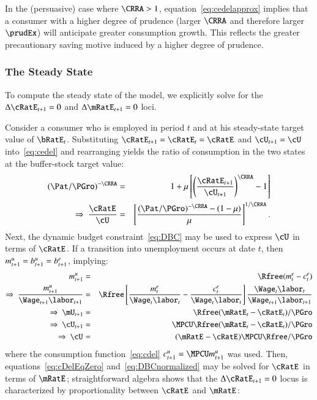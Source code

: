 \documentclass[titlepage,abstract]{\econtex}\newcommand{\texname}{ctDiscrete}
\begin{document}
In the (persuasive) case where $\CRRA > 1$, equation~\eqref{eq:cedelapprox} implies that a consumer with a higher degree of prudence (larger $\CRRA$ and therefore larger $\prudEx$) will anticipate greater consumption growth.  This reflects the greater precautionary saving motive induced by a higher degree of prudence.

\subsubsection{The Steady State}
To compute the steady state of the model, we explicitly solve for the $\Delta \cRatE_{t+1}=0$ and $\Delta \mRatE_{t+1}=0$ loci. 

Consider a consumer who is employed in period $t$ and at his steady-state target value of $\bRatE_{t}$. Substituting $\cRatE_{t+1} = \cRatE_{t} = \cRatE_{\tSS}$ and  $\cU_{t+1} =  \cU_{\tSS}$ into~\eqref{eq:cedel} and rearranging yields the ratio of consumption in the two states at the buffer-stock target value:
\begin{eqnarray}
  (\Pat/\PGro)^{-\CRRA}
  & = & 
  1+\urate
  \left[\left(\frac{\cRatE_{t+1}}{\cU_{t+1}}\right)^{\CRRA}-1\right]
\nonumber  
\\
\Rightarrow \
\frac{\cRatE_{\tSS}}{\cU_{\tSS}} 
& = & 
\left[\frac{(\Pat/\PGro)^{-\CRRA}-(1-\urate)}{\urate}\right]^{1/\CRRA}
\label{eq:cDelEqZero}
.
\end{eqnarray}
Next, the dynamic budget constraint~\eqref{eq:DBC} may be used to express $\cU_{\tSS}$ in terms of $\cRatE_{\tSS}$. If a transition into unemployment occurs at date $t$, then $m_{t+1}^{u} = b_{t+1}^{u} = b_{t+1}^{e}$, implying:
\begin{eqnarray}
  \mLev_{t+1}^{u}
  & = & 
  \Rfree (\mLev_{t}^{e}-\cLev_{t}^{e})
\nonumber  
\\
\Rightarrow \
\frac{\mLev_{t+1}^{u}}{\Wage_{t+1}\labor_{t+1}}
  & = & 
\Rfree \left[\frac{\mLev_{t}^{e}}{\Wage_{t}\labor_{t}} - \frac{\cLev_{t}^{e}}{\Wage_{t}\labor_{t}}\right] \frac{\Wage_{t}\labor_{t}}{\Wage_{t+1}\labor_{t+1}}
\nonumber  
\\
\Rightarrow \
\mU_{t+1} 
  & = & 
 \Rfree (\mRatE_{t}-\cRatE_{t})/\PGro 
\nonumber  
\\
\Rightarrow \
\cU_{t+1} 
  & = & 
 \MPCU \Rfree (\mRatE_{t}-\cRatE_{t})/\PGro 
\nonumber  
\\
\Rightarrow \
\cU_{\tSS}
  & = & 
(\mRatE_{\tSS}-\cRatE_{\tSS}) \MPCU \Rfree/\PGro 
\label{eq:DBCnormalized}
\end{eqnarray}
where the consumption function~\eqref{eq:cdel} $\cLev_{t+1}^{u} =  \MPCU \mLev_{t+1}^{u}$ was used. Then, equations~\eqref{eq:cDelEqZero} and~\eqref{eq:DBCnormalized} may be solved for $\cRatE_{\tSS}$ in terms of $\mRatE_{\tSS}$; straightforward algebra shows that the $\Delta \cRatE_{t+1}=0$ locus is characterized by proportionality between $\cRatE_{\tSS}$ and $\mRatE_{\tSS}$:
\end{document}

